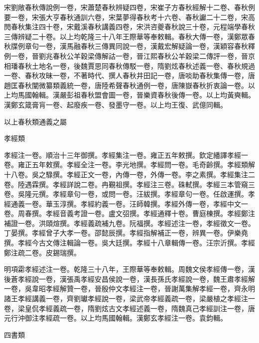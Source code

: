 \begin{pinyinscope}
宋劉敞春秋傳說例一卷，宋蕭楚春秋辨疑四卷，宋崔子方春秋經解十二卷、春秋例要一卷，宋張大亨春秋通訓六卷，宋葉夢得春秋考十六卷、春秋讞二十二卷，宋高閌春秋集注四十卷，宋戴溪春秋講義四卷，宋洪咨夔春秋說三十卷，元程端學春秋三傳辨疑二十卷。以上均乾隆三十八年王際華等奉敕輯。春秋大傳一卷，漢鄭眾春秋牒例章句一卷，漢馬融春秋三傳異同說一卷，漢戴宏解疑論一卷，漢穎容春秋釋例一卷，晉劉兆春秋公羊穀梁傳解詁一卷，晉江熙春秋公羊穀梁二傳評一卷，晉京相璠春秋土地名一卷，後魏賈思同春秋傳駁一卷，隋劉炫春秋述義一卷、春秋規過一卷、春秋攻昧一卷，不著時代、撰人春秋井田記一卷，唐啖助春秋集傳一卷，唐趙匡春秋闡微纂類義統一卷，唐陸希聲春秋通例一卷，唐陳嶽春秋折衷論一卷。以上均馬國翰輯。漢嚴彭祖春秋盟會圖一卷，晉樂資春秋後傳一卷。以上均黃奭輯。漢鄭玄箴膏肓一卷、起廢疾一卷、發墨守一卷。以上均王復、武億同輯。

以上春秋類通義之屬

孝經類

孝經注一卷。順治十三年御撰。孝經集注一卷。雍正五年敕撰。欽定繙譯孝經一卷。雍正五年敕撰。孝經全注一卷。李光地撰。孝經問一卷。毛奇齡撰。孝經類解十八卷。吳之騄撰。孝經正文一卷，內傳一卷，外傳一卷。李之素撰。孝經集注二卷。陸遇霖撰。孝經詳說二卷。冉覲祖撰。孝經注三卷。硃軾撰。孝經三本管窺三卷。吳隆元撰。孝經章句一卷，或問一卷。汪紱撰。孝經章句一卷。任啟運撰。孝經通義一卷。華玉淳撰。孝經約義一卷。汪師韓撰。孝經外傳一卷，孝經中文一卷。周春撰。孝經音義考證一卷。盧文弨撰。孝經通釋十卷。曹庭棟撰。孝經鄭注補證一卷。洪頤煊撰。孝經義疏補九卷。阮福撰。孝經述注一卷，孝經徵文一卷。丁晏撰。孝經曾子大孝一卷。邵懿辰撰。孝經指解補正一卷，辨異一卷。伊樂堯撰。孝經今古文傳注輯論一卷。吳大廷撰。孝經十八章輯傳一卷。汪宗沂撰。孝經鄭注疏二卷。皮錫瑞撰。

明項霦孝經述注一卷。乾隆三十八年，王際華等奉敕輯。周魏文侯孝經傳一卷，漢後蒼孝經說一卷，漢張禹孝經安昌侯說一卷，漢長孫氏孝經說一卷，魏王肅孝經解一卷，吳韋昭孝經解贊一卷，晉殷仲文孝經注一卷，晉謝萬集解孝經一卷，齊永明諸王孝經講義一卷，齊劉瓛孝經說一卷，梁武帝孝經義疏一卷，梁嚴植之孝經注一卷，梁皇侃孝經義疏一卷，隋劉炫古文孝經述義一卷，隋魏真己孝經訓注一卷，唐元行沖御注孝經疏一卷。以上均馬國翰輯。漢鄭玄孝經注一卷。袁鈞輯。

四書類


\end{pinyinscope}
